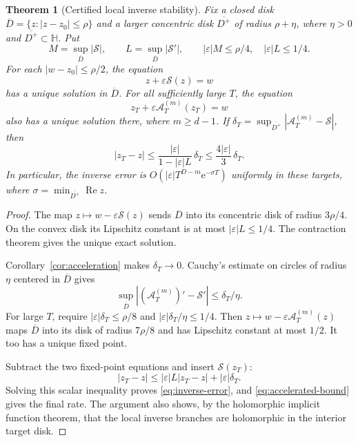 \documentclass[11pt,a4paper]{article}
\numberwithin{equation}{section}
\newtheorem{theorem}{Theorem}[section]
\theoremstyle{definition}
\theoremstyle{remark}
\newcommand{\e}{\mathrm e}
\newcommand{\re}{\operatorname{Re}}
\newcommand{\Hh}{\mathbb H}
\newcommand{\Ssum}{\mathcal S}
\newcommand{\Accel}{\mathcal A}
\begin{document}
\begin{theorem}[Certified local inverse stability]
\label{thm:inverse}
Fix a closed disk
$\overline{D}=\{z:|z-z_0|\le\rho\}$ and a larger concentric disk
$\overline{D^+}$ of radius $\rho+\eta$, where $\eta>0$ and
$\overline{D^+}\subset\Hh$. Put
\begin{equation}
 M=\sup_{\overline D}|\Ssum|,\qquad
 L=\sup_{\overline D}|\Ssum'|,
 \qquad |\varepsilon|M\le\rho/4,\quad
 |\varepsilon|L\le1/4.
 \label{eq:inverse-hypotheses}
\end{equation}
For each $|w-z_0|\le\rho/2$, the equation
\begin{equation}
 z+\varepsilon\Ssum(z)=w
 \label{eq:inverse-exact}
\end{equation}
has a unique solution in $\overline D$. For all sufficiently large $T$,
the equation
\begin{equation}
 z_T+\varepsilon\Accel_T^{(m)}(z_T)=w
 \label{eq:inverse-approximate}
\end{equation}
also has a unique solution there, where $m\ge d-1$. If
$\delta_T=\sup_{\overline{D^+}}|\Accel_T^{(m)}-\Ssum|$, then
\begin{equation}
 |z_T-z|\le
     \frac{|\varepsilon|}{1-|\varepsilon|L}\,\delta_T
   \le\frac{4|\varepsilon|}{3}\,\delta_T.
 \label{eq:inverse-error}
\end{equation}
In particular, the inverse error is
$O(|\varepsilon|T^{D-m}\e^{-\sigma T})$ uniformly in these targets,
where $\sigma=\min_{\overline{D^+}}\re z$.
\end{theorem}
\begin{proof}
The map $z\mapsto w-\varepsilon\Ssum(z)$ sends $\overline D$ into
its concentric disk of radius $3\rho/4$. On the convex disk its
Lipschitz constant is at most $|\varepsilon|L\le1/4$.
The contraction theorem gives the unique exact solution.

Corollary~\ref{cor:acceleration} makes $\delta_T\to0$. Cauchy's
estimate on circles of radius $\eta$ centered in $\overline D$ gives
\[
 \sup_{\overline D}|(\Accel_T^{(m)})'-\Ssum'|\le\delta_T/\eta.
\]
For large $T$, require
$|\varepsilon|\delta_T\le\rho/8$ and
$|\varepsilon|\delta_T/\eta\le1/4$. Then
$z\mapsto w-\varepsilon\Accel_T^{(m)}(z)$ maps $\overline D$ into
its disk of radius $7\rho/8$ and has Lipschitz constant at most $1/2$.
It too has a unique fixed point.

Subtract the two fixed-point equations and insert $\Ssum(z_T)$:
\[
 |z_T-z|\le|\varepsilon|L|z_T-z|
          +|\varepsilon|\delta_T.
\]
Solving this scalar inequality proves \eqref{eq:inverse-error}, and
\eqref{eq:accelerated-bound} gives the final rate. The argument also
shows, by the holomorphic implicit function theorem, that the local
inverse branches are holomorphic in the interior target disk.
\end{proof}
\end{document}
